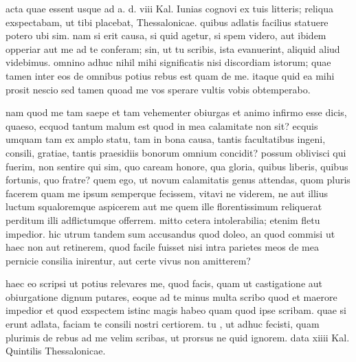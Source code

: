 


 acta quae essent usque ad a. d. viii Kal. Iunias cognovi ex tuis litteris; reliqua exspectabam, ut tibi placebat, Thessalonicae. quibus adlatis facilius statuere potero ubi sim. nam si erit causa, si quid agetur, si spem videro, aut ibidem opperiar aut me ad te conferam; sin, ut tu scribis, ista evanuerint, aliquid aliud videbimus. omnino adhuc nihil mihi significatis nisi discordiam istorum; quae tamen inter eos de omnibus potius rebus est quam de me. itaque quid ea mihi prosit nescio sed tamen quoad me vos sperare vultis vobis obtemperabo.

 nam quod me tam saepe et tam vehementer obiurgas et animo infirmo esse dicis, quaeso, ecquod tantum malum est quod in mea calamitate non sit? ecquis umquam tam ex amplo statu, tam in bona causa, tantis facultatibus ingeni, consili, gratiae, tantis praesidiis bonorum omnium concidit? possum oblivisci qui fuerim, non sentire qui sim, quo caream honore, qua gloria, quibus liberis, quibus fortunis, quo fratre? quem ego, ut novum calamitatis genus attendas, quom pluris facerem quam me ipsum semperque fecissem, vitavi ne viderem, ne aut illius luctum squaloremque aspicerem aut me quem ille florentissimum reliquerat perditum illi adflictumque offerrem. mitto cetera intolerabilia; etenim fletu impedior. hic utrum tandem sum accusandus quod doleo, an quod commisi ut haec non aut retinerem, quod facile fuisset nisi intra parietes meos de mea pernicie consilia inirentur, aut certe vivus non amitterem?

 haec eo scripsi ut potius relevares me, quod facis, quam ut castigatione aut obiurgatione dignum putares, eoque ad te minus multa scribo quod et maerore impedior et quod exspectem istinc magis habeo quam quod ipse scribam. quae si erunt adlata, faciam te consili nostri certiorem. tu , ut adhuc fecisti, quam plurimis de rebus ad me velim scribas, ut prorsus ne quid ignorem. data xiiii Kal. Quintilis Thessalonicae.
